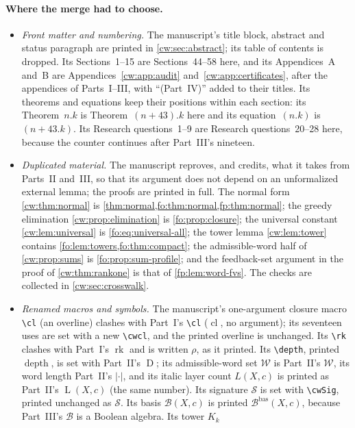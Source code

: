 \documentclass[11pt,letterpaper]{article}
\numberwithin{equation}{section}
\theoremstyle{definition}
\theoremstyle{remark}
\theoremstyle{definition}
\newcommand{\cl}{\operatorname{cl}}
\newcommand{\rk}{\operatorname{rk}}
\newcommand{\W}{\mathcal W}
\newcommand{\depth}{\operatorname{D}}
\newcommand{\layers}{\operatorname{L}}
\newcommand{\len}[1]{\lvert #1\rvert}
\newcommand{\B}{\mathcal B}
\newcommand{\cwcl}[1]{\overline{#1}}
\newcommand{\cwSig}{\mathcal S}
\newcommand{\cwBas}{\mathcal B^{\mathrm{bas}}}
\begin{document}
\paragraph{Where the merge had to choose.}
\begin{itemize}
\item \emph{Front matter and numbering.} The manuscript's title block,
abstract and status paragraph are printed in \cref{cw:sec:abstract}; its
table of contents is dropped. Its Sections~1--15 are Sections~44--58 here, and
its Appendices~A and~B are Appendices~\ref{cw:app:audit}
and~\ref{cw:app:certificates}, after the appendices of Parts~I--III, with
``(Part~IV)'' added to their titles. Its theorems and equations keep their
positions within each section: its Theorem~$n.k$ is Theorem~$(n+43).k$ here
and its equation~$(n.k)$ is~$(n+43.k)$. Its Research questions~1--9 are
Research questions~20--28 here, because the counter continues after
Part~III's nineteen.
\item \emph{Duplicated material.} The manuscript reproves, and credits, what
it takes from Parts~II and~III, so that its argument does not depend on an
unformalized external lemma; the proofs are printed in full. The normal form
\cref{cw:thm:normal} is \cref{thm:normal,fo:thm:normal,fp:thm:normal}; the
greedy elimination \cref{cw:prop:elimination} is \cref{fo:prop:closure}; the
universal constant \cref{cw:lem:universal} is \eqref{fo:eq:universal-all};
the tower lemma \cref{cw:lem:tower} contains \cref{fo:lem:towers,fo:thm:compact};
the admissible-word half of \cref{cw:prop:sums} is \cref{fo:prop:sum-profile};
and the feedback-set argument in the proof of \cref{cw:thm:rankone} is that of
\cref{fp:lem:word-fvs}. The checks are collected in \cref{cw:sec:crosswalk}.
\item \emph{Renamed macros and symbols.} The manuscript's one-argument
closure macro \verb|\cl| (an overline) clashes with Part~I's \verb|\cl|
($\cl$, no argument); its seventeen uses are set with a new \verb|\cwcl|, and
the printed overline is unchanged. Its \verb|\rk| clashes with Part~I's
$\rk$ and is written $\rho$, as it printed. Its \verb|\depth|, printed
$\operatorname{depth}$, is set with Part~II's $\depth$; its admissible-word
set $\mathcal W$ is Part~II's $\W$, its word length Part~II's $\len{\cdot}$,
and its italic layer count $L(X,c)$ is printed as Part~II's $\layers(X,c)$
(the same number). Its signature $\mathcal S$ is set with \verb|\cwSig|,
printed unchanged as $\cwSig$. Its basis $\mathcal B(X,c)$ is printed
$\cwBas(X,c)$, because Part~III's $\B$ is a Boolean algebra. Its tower $K_k$

\end{itemize}
\end{document}

